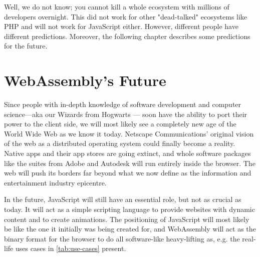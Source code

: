 \documentclass[10pt]{article}
\begin{document}
\begin{sloppypar}
  Well, we do not know; you cannot kill a whole ecosystem with millions of developers overnight. This did not work for other "dead-talked" ecosystems like PHP and will not work for JavaScript either. However, different people have different predictions. Moreover, the following chapter describes some predictions for the future.

  \section{WebAssembly's Future}
  \label{sec:webassembly-future}

  Since people with in-depth knowledge of software development and computer science—aka our Wizards from Hogwarts — soon have the ability to port their power to the client side, we will most likely see a completely new age of the World Wide Web as we know it today. Netscape Communications’ original vision of the web as a distributed operating system could finally become a reality. Native apps and their app stores are going extinct, and whole software packages like the suites from Adobe and Autodesk will run entirely inside the browser. The web will push its borders far beyond what we now define as the information and entertainment industry epicentre.

  In the future, JavaScript will still have an essential role, but not as crucial as today. It will act as a simple scripting language to provide websites with dynamic content and to create animations. The positioning of JavaScript will most likely be like the one it initially was being created for, and WebAssembly will act as the binary format for the browser to do all software-like heavy-lifting as, e.g. the real-life uses cases in \autoref{tab:use-cases} present.


\end{sloppypar}
\end{document}
